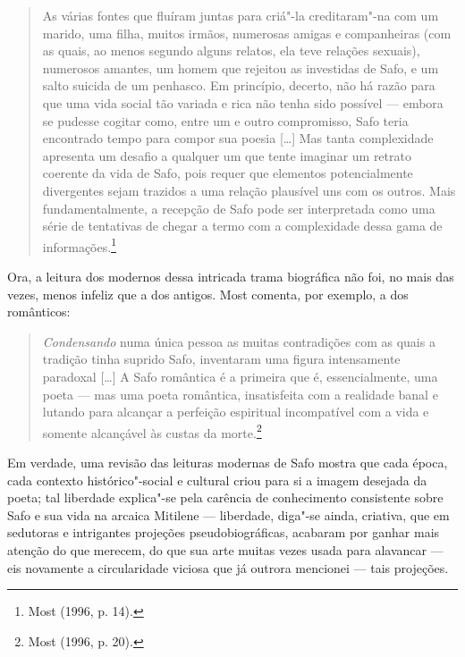 \begin{quote}
As várias fontes que fluíram juntas para criá"-la creditaram"-na com um marido,
uma filha, muitos irmãos, numerosas amigas e companheiras (com as quais, ao
menos segundo alguns relatos, ela teve relações sexuais), numerosos amantes, um
homem que rejeitou as investidas de Safo, e um salto suicida de um penhasco. Em
princípio, decerto, não há razão para que uma vida social tão variada e rica
não tenha sido possível --- embora se pudesse cogitar como, entre um e outro
compromisso, Safo teria encontrado tempo para compor sua poesia [\ldots{}] Mas tanta
complexidade apresenta um desafio a qualquer um que tente imaginar um retrato
coerente da vida de Safo, pois requer que elementos potencialmente divergentes
sejam trazidos a uma relação plausível uns com os outros. Mais
fundamentalmente, a recepção de Safo pode ser interpretada como uma série de
tentativas de chegar a termo com a complexidade dessa gama de informações.\footnote{ Most (1996, p. 14).}
\end{quote}

Ora, a leitura dos modernos dessa intricada trama biográfica não foi, no mais
das vezes, menos infeliz que a dos antigos. Most comenta, por exemplo,
a dos românticos:

\begin{quote}
\textit{Condensando} numa única pessoa as muitas contradições com as quais a
tradição tinha suprido Safo, inventaram uma figura intensamente paradoxal
[\ldots{}] A Safo romântica é a primeira que é, essencialmente, uma poeta --- mas uma
poeta romântica, insatisfeita com a realidade banal e lutando para alcançar a
perfeição espiritual incompatível com a vida e somente alcançável às custas da
morte.\footnote{ Most (1996, p. 20).}
\end{quote}

Em verdade, uma revisão das leituras modernas de Safo mostra que cada época,
cada contexto histórico"-social e cultural criou para si a imagem desejada da
poeta; tal liberdade explica"-se pela carência de conhecimento consistente sobre
Safo e sua vida na arcaica Mitilene --- liberdade, diga"-se ainda, criativa, que
em sedutoras e intrigantes projeções pseudobiográficas, acabaram por
ganhar mais atenção do que merecem, do que sua arte
muitas vezes usada para alavancar --- eis novamente a circularidade viciosa que
já outrora mencionei --- tais projeções. 


